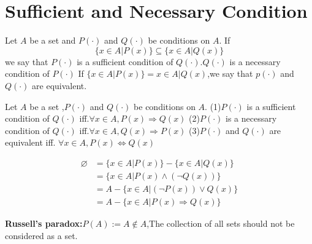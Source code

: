 \documentclass{book}
\begin{document}
\section{Sufficient and Necessary Condition}
\begin{definitionenv}
    Let $A$ be a set and $P(\cdot)$ and $Q(\cdot)$ be conditions on $A$.
    If $$\{x\in A|P(x)\}\subseteq\{x\in A|Q(x)\}$$ we say that $P(\cdot)$ is a sufficient condition of $Q(\cdot)$.$Q(\cdot)$ is a necessary condition of $P(\cdot)$
    \newline
    If $\{x\in A|P(x)\}={x\in A|Q(x)}$,we say that $p(\cdot)$ and $Q(\cdot)$ are equivalent.
\end{definitionenv}
\begin{propositionenv}
    Let $A$ be a set ,$P(\cdot)$ and $Q(\cdot)$ be conditions on $A$.
    \newline
    (1)$P(\cdot)$ is a sufficient condition of $Q(\cdot)$ iff.$\forall x\in A,P(x)\Rightarrow Q(x)$
    \newline
    (2)$P(\cdot) $ is a necessary condition of $Q(\cdot)$ iff.$\forall x\in A,Q(x)\Rightarrow P(x)$
    \newline
    (3)$P(\cdot)$ and $Q(\cdot)$ are equivalent iff. $\forall x\in A,P(x)\Leftrightarrow Q(x)$
\end{propositionenv}
\begin{proofenv}
\begin{align*}
    \varnothing&=\{x\in A|P(x)\}- \{x\in A|Q(x)\}\\
    &=\{x\in A|P(x)\wedge (\neg Q(x))\}\\
    &=A-\{x\in A|(\neg P(x))\vee  Q(x)\}\\
    &=A-\{x\in A |P(x)\Rightarrow Q(x)\}
\end{align*}
\end{proofenv}
\textbf{Russell's paradox:}$P(A):=A\notin A$,The collection of all sets should not be considered as a set.
\end{document}
